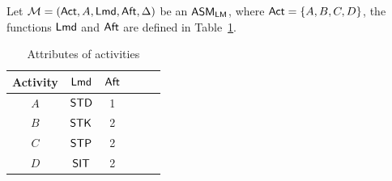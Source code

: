 \begin{example}
	Let ${\mathcal{M} } = ({\sf Act},A,{\sf Lmd},{\sf Aft},\Delta)$ be an $\textsf{ASM}_\textsf{LM}$, where ${\sf Act} = \{A,B,C,D\}$, the functions ${\sf Lmd}$ and ${\sf Aft}$ are defined in Table~\ref{tab-attribute}.
	\begin{table}[htbp]
		\begin{center}
		\begin{tabular}{|c|c|c|c|c|c|}
		\hline
		Activity & ${\sf Lmd}$ & ${\sf Aft}$\\
		\hline
		$A$ & $\mathsf{STD}$ & 1 \\
		\hline
		$B$ & $\mathsf{STK}$ & 2 \\
		\hline
		$C$ & $\mathsf{STP}$ & 2 \\
		\hline
		$D$ & $\mathsf{SIT}$ & 2 \\
		\hline
		\end{tabular}
		\caption{Attributes of activities}
		\label{tab-attribute}
		\end{center}
	\end{table}
			

\end{example}
